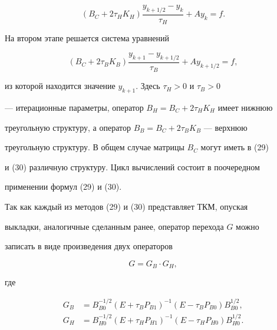 \begin{equation} 


(B_C+2\tau_H K_H)\frac{y_{k+1/2}-y_k}{\tau_H}+A y_k=f. 


\end{equation} 


На втором этапе решается система уравнений 


\begin{equation} 


(B_C+2\tau_B K_B)\frac{y_{k+1}-y_{k+1/2}}{\tau_B}+ 


A y_{k+1/2}=f, 


\end{equation} 


из которой находится значение $y_{k+1}$. Здесь $\tau_H>0$ и $\tau_B>0$ 


--- итерационные параметры, оператор $B_H=B_C+2\tau_H K_H$ имеет нижнюю 


треугольную структуру, а оператор $B_B=B_C+2\tau_B K_B$ --- верхнюю 


треугольную структуру. В общем случае матрицы $B_C$ могут иметь в (29) 


и (30) различную структуру. Цикл вычислений состоит в поочередном 


применении формул (29) и (30). 


 


Так как каждый из методов (29) и (30) представляет ТКМ, опуская 


выкладки, аналогичные сделанным ранее, оператор перехода $G$ можно 


записать в виде произведения двух операторов 


$$ 


G=G_B\cdot G_H, 


$$ 


где 


\begin{align*} 


G_B&=B^{-1/2}_{B0}(E+\tau_B P_{B1})^{-1} 


(E-\tau_B P_{B0})B^{1/2}_{B0}, \\ 


% 


G_H&=B^{-1/2}_{H0}(E+\tau_H P_{H1})^{-1} 


(E-\tau_H P_{H0})B^{1/2}_{H0}. 


\end{align*} 


 


